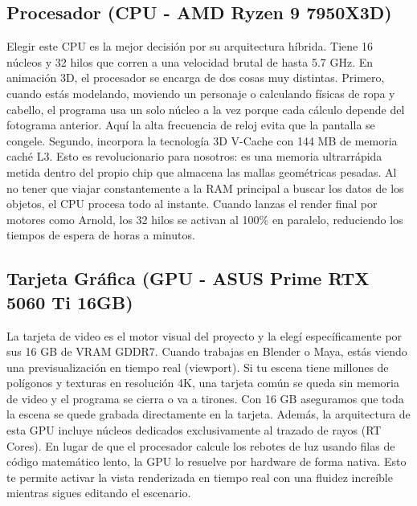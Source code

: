 \documentclass[14pt,a4paper]{extarticle}
\begin{document}
\subsection*{\centering Procesador (CPU - AMD Ryzen 9 7950X3D)}
Elegir este CPU es la mejor decisión por su arquitectura híbrida. Tiene 16 núcleos y 32 hilos que corren a una velocidad brutal de hasta 5.7 GHz. En animación 3D, el procesador se encarga de dos cosas muy distintas. Primero, cuando estás modelando, moviendo un personaje o calculando físicas de ropa y cabello, el programa usa un solo núcleo a la vez porque cada cálculo depende del fotograma anterior. Aquí la alta frecuencia de reloj evita que la pantalla se congele. Segundo, incorpora la tecnología 3D V-Cache con 144 MB de memoria caché L3. Esto es revolucionario para nosotros: es una memoria ultrarrápida metida dentro del propio chip que almacena las mallas geométricas pesadas. Al no tener que viajar constantemente a la RAM principal a buscar los datos de los objetos, el CPU procesa todo al instante. Cuando lanzas el render final por motores como Arnold, los 32 hilos se activan al 100\% en paralelo, reduciendo los tiempos de espera de horas a minutos.

\subsection*{\centering Tarjeta Gráfica (GPU - ASUS Prime RTX 5060 Ti 16GB)}
La tarjeta de video es el motor visual del proyecto y la elegí específicamente por sus 16 GB de VRAM GDDR7. Cuando trabajas en Blender o Maya, estás viendo una previsualización en tiempo real (viewport). Si tu escena tiene millones de polígonos y texturas en resolución 4K, una tarjeta común se queda sin memoria de video y el programa se cierra o va a tirones. Con 16 GB aseguramos que toda la escena se quede grabada directamente en la tarjeta. Además, la arquitectura de esta GPU incluye núcleos dedicados exclusivamente al trazado de rayos (RT Cores). En lugar de que el procesador calcule los rebotes de luz usando filas de código matemático lento, la GPU lo resuelve por hardware de forma nativa. Esto te permite activar la vista renderizada en tiempo real con una fluidez increíble mientras sigues editando el escenario.
\end{document}
